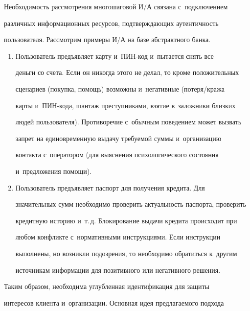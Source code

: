 \vspace*{-2pt}





  Необходимость рассмотрения многошаговой И\!/\!А связана с~подключением 


различных информационных ресурсов, подтверждающих аутентичность 


пользователя. Рассмотрим примеры И\!/\!А на базе абстрактного банка. 


  \begin{enumerate}[1.]


\item Пользователь предъявляет карту и~ПИН-код и~пытается снять все 


деньги со счета. Если он никогда этого не делал, то кроме положительных 


сценариев (покупка, помощь) возможны и~негативные (по\-те\-ря/кра\-жа 


карты и~ПИН-ко\-да, шантаж преступниками, взятие в~заложники близких 


людей пользователя). Противоречие с~обычным поведением может вызвать 


запрет на единовременную выдачу требуемой суммы и~организацию 


контакта с~оператором (для выяснения психологического состояния 


и~предложения помощи).


\item Пользователь предъявляет паспорт для получения кредита. Для 


значительных сумм необходимо проверить актуальность паспорта, проверить 


кредитную историю и~т.\,д. Блокирование выдачи кредита происходит при 


любом конфликте с~нормативными инструкциями. Если инструкции 


выполнены, но возникли подозрения, то необходимо обратиться к~другим 


источникам информации для позитивного или негативного решения.


  \end{enumerate}


  


  Таким образом, необходима углубленная идентификация для защиты 


интересов клиента и~организации. Основная идея предлагаемого подхода 


